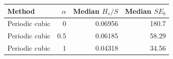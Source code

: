 \begin{tabular}{lrrr}
\toprule
Method & $\alpha$ & Median $H_s/S$ & Median $S E_b$ \\
\midrule
Periodic cubic & 0 & 0.06956 & 180.7 \\
Periodic cubic & 0.5 & 0.06185 & 58.29 \\
Periodic cubic & 1 & 0.04318 & 34.56 \\
\bottomrule
\end{tabular}
